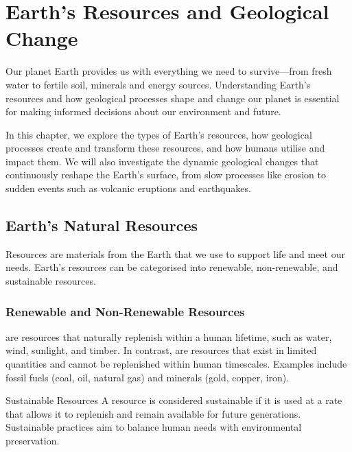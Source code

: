 \chapter{Earth's Resources and Geological Change}

Our planet Earth provides us with everything we need to survive—from fresh water to fertile soil, minerals and energy sources. Understanding Earth's resources and how geological processes shape and change our planet is essential for making informed decisions about our environment and future.

In this chapter, we explore the types of Earth's resources, how geological processes create and transform these resources, and how humans utilise and impact them. We will also investigate the dynamic geological changes that continuously reshape the Earth's surface, from slow processes like erosion to sudden events such as volcanic eruptions and earthquakes.

\section{Earth's Natural Resources}

Resources are materials from the Earth that we use to support life and meet our needs. Earth's resources can be categorised into renewable, non-renewable, and sustainable resources.

\subsection{Renewable and Non-Renewable Resources}

 are resources that naturally replenish within a human lifetime, such as water, wind, sunlight, and timber. In contrast,  are resources that exist in limited quantities and cannot be replenished within human timescales. Examples include fossil fuels (coal, oil, natural gas) and minerals (gold, copper, iron).

\begin{marginfigure}
\caption{Comparison of renewable and non-renewable resources.}
\end{marginfigure}

\begin{keyconcept}{Sustainable Resources}
A resource is considered sustainable if it is used at a rate that allows it to replenish and remain available for future generations. Sustainable practices aim to balance human needs with environmental preservation.
\end{keyconcept}

